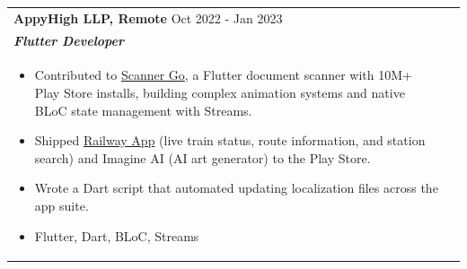 \documentclass[a4paper,8pt]{article}
\begin{document}
\begin{tabularx}{\linewidth}{ @{}l r@{} }
\color[HTML]{1C033C} \textbf{AppyHigh LLP, Remote} \hfill \color[HTML]{371e77} Oct 2022 - Jan 2023 \\[4pt]
\color[HTML]{371e77}\textbf{\textit{Flutter Developer}}\ \hfill \color[HTML]{4B28A4} \\[5pt]
\begin{minipage}[t]{\linewidth}
    \begin{itemize}[nosep,after=\strut, leftmargin=2em, itemsep=2pt]
        \item Contributed to \href{https://play.google.com/store/apps/details?id=com.cam.scanner.camscanner.documentscanner}{Scanner Go}, a Flutter document scanner with 10M+ Play Store installs, building complex animation systems and native BLoC state management with Streams.
        \item Shipped \href{https://play.google.com/store/apps/details?id=railway.app.train.status}{Railway App} (live train status, route information, and station search) and Imagine AI (AI art generator) to the Play Store.
        \item Wrote a Dart script that automated updating localization files across the app suite.
        \item Flutter, Dart, BLoC, Streams
    \end{itemize}
    \end{minipage}
\end{tabularx}\\[3pt]

\end{document}
